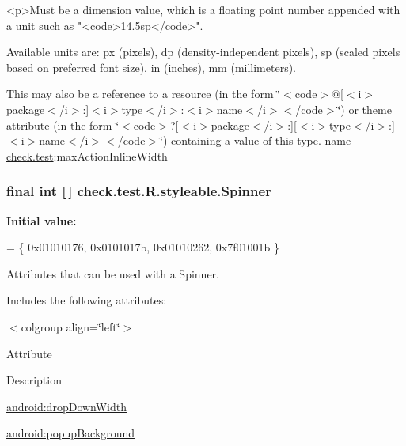 \begin{DoxyVerb}      <p>Must be a dimension value, which is a floating point number appended with a unit such as "<code>14.5sp</code>".
\end{DoxyVerb}
 Available units are\+: px (pixels), dp (density-\/independent pixels), sp (scaled pixels based on preferred font size), in (inches), mm (millimeters). 

This may also be a reference to a resource (in the form \char`\"{}$<$code$>$@\mbox{[}$<$i$>$package$<$/i$>$\+:\mbox{]}$<$i$>$type$<$/i$>$\+:$<$i$>$name$<$/i$>$$<$/code$>$\char`\"{}) or theme attribute (in the form \char`\"{}$<$code$>$?\mbox{[}$<$i$>$package$<$/i$>$\+:\mbox{]}\mbox{[}$<$i$>$type$<$/i$>$\+:\mbox{]}$<$i$>$name$<$/i$>$$<$/code$>$\char`\"{}) containing a value of this type.  name \hyperlink{namespacecheck_1_1test}{check.\+test}\+:max\+Action\+Inline\+Width \hypertarget{classcheck_1_1test_1_1_r_1_1styleable_ae9bbc621da309e840c0cacd528d5d439}{}
\subsubsection[{Spinner}]{\setlength{\rightskip}{0pt plus 5cm}final int \mbox{[}$\,$\mbox{]} check.\+test.\+R.\+styleable.\+Spinner\hspace{0.3cm}{\ttfamily [static]}}\label{classcheck_1_1test_1_1_r_1_1styleable_ae9bbc621da309e840c0cacd528d5d439}
{\bfseries Initial value\+:}
\begin{DoxyCode}
= \{
            0x01010176, 0x0101017b, 0x01010262, 0x7f01001b
        \}
\end{DoxyCode}
Attributes that can be used with a Spinner. 

Includes the following attributes\+:

\begin{TabularC}{0}
\hline
\end{TabularC}
$<$colgroup align=\char`\"{}left\char`\"{}$>$ 

Attribute

Description 

{\ttfamily \hyperlink{classcheck_1_1test_1_1_r_1_1styleable_a0f8793af1c217d7771c8d1860fa6a1e8}{android\+:drop\+Down\+Width}}

{\ttfamily \hyperlink{classcheck_1_1test_1_1_r_1_1styleable_af3a17f8a0e3b61c605894eed3a35f9a4}{android\+:popup\+Background}}

